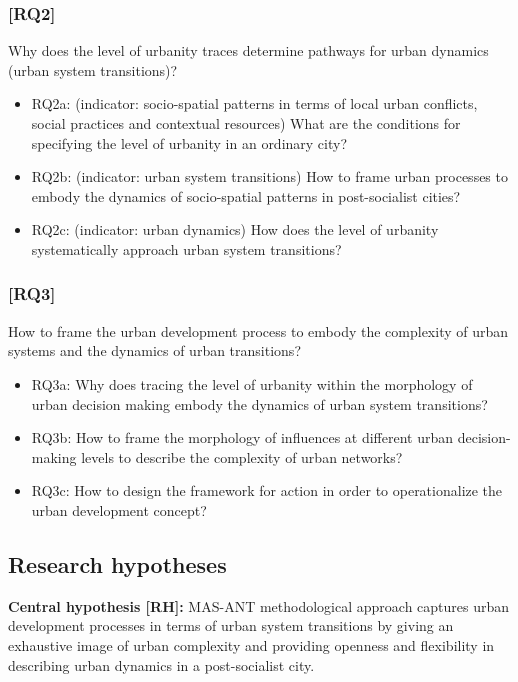 \documentclass[11pt]{report}
\begin{document}
\subsubsection{[RQ2]}
Why does the level of urbanity traces determine pathways for urban dynamics (urban system transitions)? 
\begin{itemize}
\item RQ2a: (indicator: socio-spatial patterns in terms of local urban conflicts, social practices and contextual resources) What are the conditions for specifying the level of urbanity in an ordinary city?
\item RQ2b: (indicator: urban system transitions) How to frame urban processes to embody the dynamics of socio-spatial patterns in post-socialist cities?
\item RQ2c: (indicator: urban dynamics) How does the level of urbanity systematically approach urban system transitions?
\end {itemize}

\subsubsection{[RQ3]}
How to frame the urban development process to embody the complexity of urban systems and the dynamics of urban transitions?
\begin{itemize}
\item RQ3a: Why does tracing the level of urbanity within the morphology of urban decision making embody the dynamics of urban system transitions?
\item RQ3b: How to frame the morphology of influences at different urban decision-making levels to describe the complexity of urban networks?
\item RQ3c: How to design the framework for action in order to operationalize the urban development concept?
\end {itemize}

\subsection{Research hypotheses}
\textbf{Central hypothesis [RH]:}
MAS-ANT methodological approach captures urban development processes in terms of urban system transitions by giving an exhaustive image of urban complexity and providing openness and flexibility in describing urban dynamics in a post-socialist city.
\end{document}
